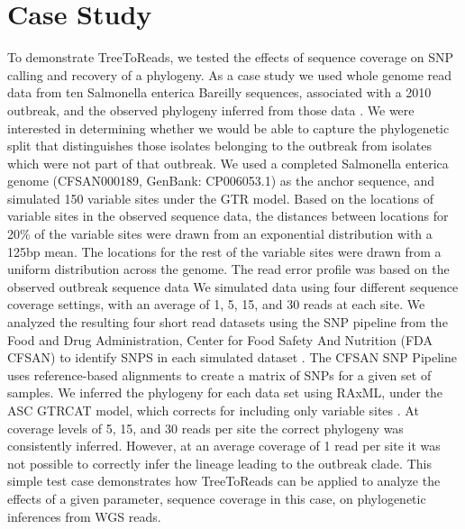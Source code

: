 \section{Case Study}
To demonstrate TreeToReads, we tested the effects of sequence coverage on SNP calling and recovery of a phylogeny.
As a case study we used whole genome read data from ten Salmonella enterica Bareilly sequences,
associated with a 2010 outbreak, and the observed phylogeny inferred from those data \citep{hoffmann_tracing_2015}.
We were interested in determining whether we would be able to capture the phylogenetic split that distinguishes those isolates belonging to the outbreak from isolates which were not part of that outbreak.
We used a completed Salmonella enterica genome (CFSAN000189, GenBank: CP006053.1) as the anchor sequence, and simulated 150 variable sites under the GTR model.
Based on the locations of variable sites in the observed sequence data, the distances between locations for 20\%  of the variable sites were drawn from an exponential distribution with a 125bp mean.
The locations for the rest of the variable sites were drawn from a uniform distribution across the genome. The read error profile was based on the observed outbreak sequence data
We simulated data using four different sequence coverage settings, with an average of 1, 5, 15, and 30 reads at each site.
We analyzed the resulting four short read datasets using the SNP pipeline from the Food and Drug Administration, Center for Food Safety And Nutrition (FDA CFSAN) to identify SNPS in each simulated dataset \citep{davis_cfsan_2015}. 
The CFSAN SNP Pipeline uses reference-based alignments to create a matrix of SNPs for a given set of samples.
We inferred the phylogeny for each data set using RAxML, under the ASC GTRCAT model, which corrects for including only variable sites \citep{stamatakis_raxml_2014}.
At coverage levels of 5, 15, and 30 reads per site the correct phylogeny was consistently inferred.
However, at an average coverage of 1 read per site it was not possible to correctly infer the lineage leading to the outbreak clade.
This simple test case demonstrates how TreeToReads can be applied to analyze the effects of a given parameter, sequence coverage in this case, on phylogenetic inferences from WGS reads. 

